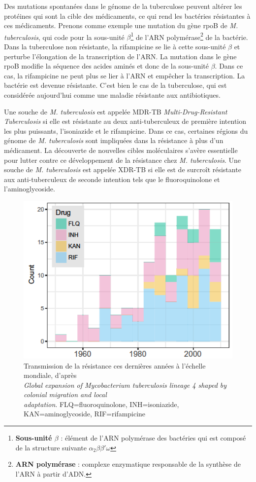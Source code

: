 \documentclass[twoside,a4paper,11pt,frenchb,openany]{report}
\begin{document}
Des mutations spontanées dans le génome de la tuberculose peuvent altérer les protéines qui sont la cible des médicaments, ce qui rend les bactéries résistantes à ces médicaments. Prenons comme exemple une mutation du gène rpoB de \textit{M. tuberculosis}, qui code pour la sous-unité $\beta$\footnote{\textbf{Sous-unité $\beta$} : élément de l'ARN polymérase des bactéries qui est composé de la structure suivante $\alpha_2 \beta \beta' \omega$} de l'ARN polymérase\footnote{\textbf{ARN polymérase} : complexe enzymatique responsable de la synthèse de l'ARN à partir d'ADN.} de la bactérie. Dans la tuberculose non résistante, la rifampicine se lie à cette sous-unité $\beta$ et perturbe l'élongation de la transcription de l'ARN. La mutation dans le gène rpoB modifie la séquence des acides aminés et donc de la sous-unité $\beta$. Dans ce cas, la rifampicine ne peut plus se lier à l'ARN et empêcher la transcription. La bactérie est devenue résistante. C'est bien le cas de la tuberculose, qui est considérée aujourd'hui comme une maladie résistante aux antibiotiques. 

Une souche de \textit{M. tuberculosis} est appelée MDR-TB \textit{Multi-Drug-Resistant Tuberculosis} si elle est résistante au deux anti-tuberculeux de première intention les plus puissants, l'isoniazide et le rifampicine. Dans ce cas, certaines régions du génome de \textit{M. tuberculosis} sont impliquées dans la résistance à plus d'un médicament. La découverte de nouvelles cibles moléculaires s'avère essentielle pour lutter contre ce développement de la résistance chez \textit{M. tuberculosis}. Une souche de \textit{M. tuberculosis} est appelée XDR-TB si elle est de surcroît résistante aux anti-tuberculeux de seconde intention tels que le fluoroquinolone et l'aminoglycoside.

\begin{figure}[h!]
\centering
\includegraphics[scale=0.6]{amr.png}
\caption{Transmission de la résistance ces dernières années à l'échelle mondiale, d'après\\ \textit{Global expansion of Mycobacterium tuberculosis lineage 4 shaped by colonial migration and local\\ adaptation}. FLQ=fluoroquinolone, INH=isoniazide, KAN=aminoglycoside, RIF=rifampicine}
\end{figure}
\end{document}

